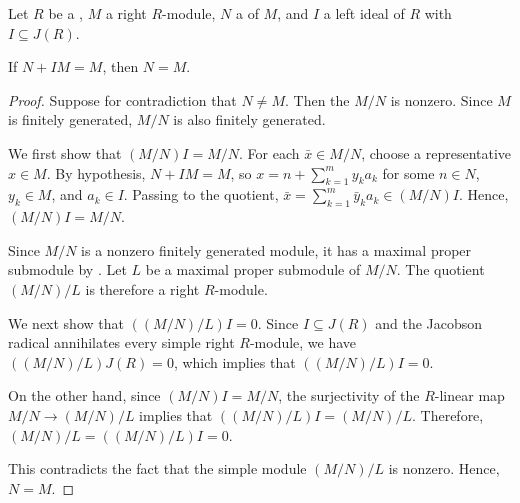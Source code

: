 \begin{lemma}  \label{lemma:nakayamas_submodule_lemma_for_finitely_generated_modules_over_a_ring}
	Let $R$ be a , $M$ a  right $R$-module, $N$ a  of $M$, and $I$ a left ideal of $R$ with $I \subseteq J(R)$.

	If $N + IM = M$, then $N = M$.
\end{lemma}
\begin{proof}
	Suppose for contradiction that $N \neq M$. Then the  $M/N$ is nonzero. Since $M$ is finitely generated, $M/N$ is also finitely generated.

	We first show that $(M/N)I = M/N$. For each $\bar{x} \in M/N$, choose a representative $x \in M$. By hypothesis, $N + IM = M$, so $x = n + \sum_{k=1}^m y_k a_k$ for some $n \in N$, $y_k \in M$, and $a_k \in I$. Passing to the quotient, $\bar{x} = \sum_{k=1}^m \bar{y}_k a_k \in (M/N)I$. Hence, $(M/N)I = M/N$.

	Since $M/N$ is a nonzero finitely generated module, it has a maximal proper submodule by . Let $L$ be a maximal proper submodule of $M/N$. The quotient $(M/N)/L$ is therefore a  right $R$-module.

	We next show that $((M/N)/L)I = 0$. Since $I \subseteq J(R)$ and the Jacobson radical annihilates every simple right $R$-module, we have $((M/N)/L)J(R) = 0$, which implies that $((M/N)/L)I = 0$.

	On the other hand, since $(M/N)I = M/N$, the surjectivity of the $R$-linear map $M/N \to (M/N)/L$ implies that $((M/N)/L)I = (M/N)/L$. Therefore, $(M/N)/L = ((M/N)/L)I = 0$.

	This contradicts the fact that the simple module $(M/N)/L$ is nonzero. Hence, $N = M$.
\end{proof}
